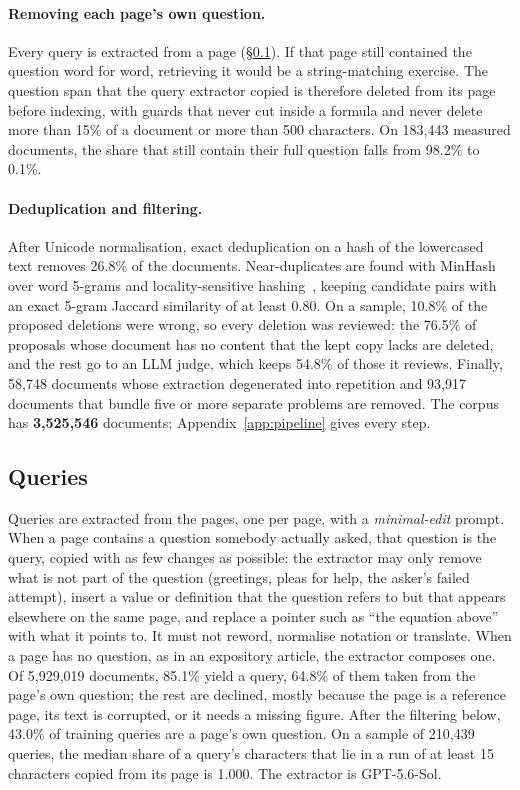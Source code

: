 \paragraph{Removing each page's own question.}
Every query is extracted from a page (\S\ref{sec:queries}). If that page still contained the question word for word, retrieving it would be a string-matching exercise. The question span that the query extractor copied is therefore deleted from its page before indexing, with guards that never cut inside a formula and never delete more than 15\% of a document or more than 500 characters. On 183,443 measured documents, the share that still contain their full question falls from 98.2\% to 0.1\%.

\paragraph{Deduplication and filtering.}
After Unicode normalisation, exact deduplication on a hash of the lowercased text removes 26.8\% of the documents. Near-duplicates are found with MinHash~\citep{broder1997resemblance} over word 5-grams and locality-sensitive hashing~\citep{indyk1998lsh}, keeping candidate pairs with an exact 5-gram Jaccard similarity of at least 0.80. On a sample, 10.8\% of the proposed deletions were wrong, so every deletion was reviewed: the 76.5\% of proposals whose document has no content that the kept copy lacks are deleted, and the rest go to an LLM judge, which keeps 54.8\% of those it reviews. Finally, 58,748 documents whose extraction degenerated into repetition and 93,917 documents that bundle five or more separate problems are removed. The corpus has \textbf{3,525,546} documents; Appendix~\ref{app:pipeline} gives every step.

\subsection{Queries}
\label{sec:queries}

Queries are extracted from the pages, one per page, with a \emph{minimal-edit} prompt. When a page contains a question somebody actually asked, that question is the query, copied with as few changes as possible: the extractor may only remove what is not part of the question (greetings, pleas for help, the asker's failed attempt), insert a value or definition that the question refers to but that appears elsewhere on the same page, and replace a pointer such as ``the equation above'' with what it points to. It must not reword, normalise notation or translate. When a page has no question, as in an expository article, the extractor composes one. Of 5,929,019 documents, 85.1\% yield a query, 64.8\% of them taken from the page's own question; the rest are declined, mostly because the page is a reference page, its text is corrupted, or it needs a missing figure. After the filtering below, 43.0\% of training queries are a page's own question. On a sample of 210,439 queries, the median share of a query's characters that lie in a run of at least 15 characters copied from its page is 1.000. The extractor is GPT-5.6-Sol.

